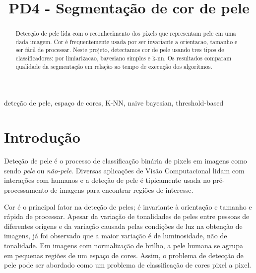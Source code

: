 \documentclass[conference]{IEEEtran}
\begin{document}
\title{PD4 - Segmentação de cor de pele}

\author{
}

\maketitle

\begin{abstract}
Detecção de pele lida com o reconhecimento dos
pixels que representam pele em uma dada imagem. Cor é frequentemente usada por ser invariante a orientacao, tamanho e ser
fácil de processar. Neste projeto, detectamos cor de pele usando
tres tipos de classificadores: por limiarizacao, bayesiano simples
e k-nn. Os resultados comparam qualidade da segmentação em
relação ao tempo de execução dos algoritmos. 
\end{abstract}

\begin{IEEEkeywords}
deteção de pele, espaço de cores, K-NN, naive bayesian, threshold-based
\end{IEEEkeywords}

\section{Introdução}

Deteção de pele é o processo de classificação binária de pixels em imagens como sendo \textit{pele} ou \textit{não-pele}. Diversas aplicações de Visão Computacional lidam com interações com humanos e a deteção de pele é tipicamente usada no pré-processamento de imagens para encontrar regiões de interesse. \cite{teo, kolkur, conci}

Cor é o principal fator na deteção de peles; é invariante à orientação e tamanho e rápida de processar. Apesar da variação de tonalidades de peles entre pessoas de diferentes origens e da variação causada pelas condições de luz na obtenção de imagens\cite{kolkur}, já foi observado que a maior variação é de luminosidade, não de tonalidade\cite{teo}. Em imagens com normalização de brilho, a pele humana se agrupa em pequenas regiões de um espaço de cores\cite{yang}.  Assim, o problema de detecção de pele pode ser abordado como um problema de classificação de cores pixel a pixel.
\end{document}
